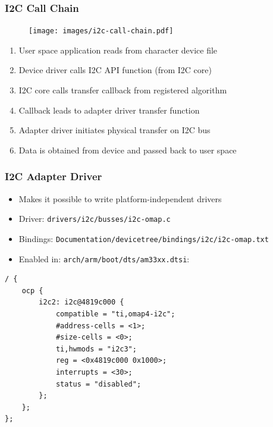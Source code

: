 \documentclass[aspectratio=169,usenames,dvipsnames]{beamer}
\newcounter{cont}
\begin{document}
\begin{frame}
  \frametitle{I2C Call Chain}
  \begin{figure}
    \centering
    \texttt{[image: images/i2c-call-chain.pdf]}
  \end{figure}
  \begin{enumerate}
    \item User space application reads from character device file
    \item Device driver calls I2C API function (from I2C core)
    \item I2C core calls transfer callback from registered algorithm
    \item Callback leads to adapter driver transfer function
    \item Adapter driver initiates physical transfer on I2C bus
    \item Data is obtained from device and passed back to user space
  \end{enumerate}
  \vspace*{-7mm}
\end{frame}

\begin{frame}[containsverbatim]
  \frametitle{I2C Adapter Driver}
  \begin{itemize}
    \item Makes it possible to write \alert{platform-independent} drivers
    \item Driver: \texttt{drivers/i2c/busses/i2c-omap.c}
    \item Bindings: \texttt{Documentation/devicetree/bindings/i2c/i2c-omap.txt}
    \item Enabled in: \texttt{arch/arm/boot/dts/am33xx.dtsi}:
  \end{itemize}
  \begin{lstlisting}
/ {
	ocp {
		i2c2: i2c@4819c000 {
			compatible = "ti,omap4-i2c";
			#address-cells = <1>;
			#size-cells = <0>;
			ti,hwmods = "i2c3";
			reg = <0x4819c000 0x1000>;
			interrupts = <30>;
			status = "disabled";
		};
	};
};
  \end{lstlisting}
  \vspace*{-12mm}
\end{frame}
\end{document}
